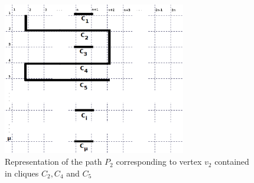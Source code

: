 \begin{figure}[htb]	
\center%
\includegraphics[width=8cm]{./img/grade2.png}
\caption{Representation of the path $P_2$ corresponding to vertex $v_2$ contained in cliques $C_2, C_4$ and $C_5$}
\label{fig:gradeDemonstracao}
\end{figure}